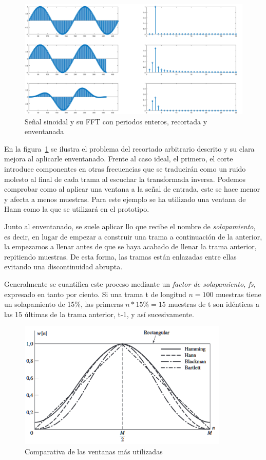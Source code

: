 \begin{figure}[!ht]
\begin{center}
\includegraphics[width=14cm]{img/problem_fft.png}
\caption{\label{fig:probfft}Señal sinoidal y su FFT con periodos enteros, recortada y enventanada}
\end{center}
\end{figure}

En la figura~\ref{fig:probfft} se ilustra el problema del recortado arbitrario descrito y su clara mejora al aplicarle enventanado. Frente al caso ideal, el primero, el corte introduce componentes en otras frecuencias que se traducirán como un ruido molesto al final de cada trama al escuchar la transformada inversa. Podemos comprobar como al aplicar una ventana a la señal de entrada, este se hace menor y afecta a menos muestras. Para este ejemplo se ha utilizado una ventana de Hann como la que se utilizará en el prototipo.

Junto al enventanado, se suele aplicar llo que recibe el nombre de  \emph{solapamiento}, es decir, en lugar de empezar a construir una trama a continuación de la anterior, la empezamos a llenar antes de que se haya acabado de llenar la trama anterior, repitiendo muestras. De esta forma, las tramas están enlazadas entre ellas evitando una discontinuidad abrupta.

Generalmente se cuantifica este proceso mediante un \emph{factor de solapamiento, fs,} expresado en tanto por ciento. Si una trama t de longitud $n = 100$ muestras tiene un solapamiento de 15\%, las primeras $n*15\% = 15$ muestras de t son idénticas a las 15 últimas de la trama anterior, t-1, y así sucesivamente.

\begin{figure}[!b]
\begin{center}
\includegraphics[width=10cm]{img/ventanas_grafica.png}
\caption{\label{fig:compven}Comparativa de las ventanas más utilizadas}
\end{center}
\end{figure}

